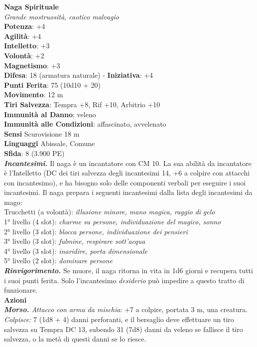 \begin{multicols}{2}
\medskip\textbf{Naga Spirituale}\\
\emph{Grande mostruosità, caotico malvagio}\\
\textbf{Potenza}: +4\\
\textbf{Agilità}: +4\\
\textbf{Intelletto}: +3\\
\textbf{Volontà}: +2\\
\textbf{Magnetismo}: +3\\
\textbf{Difesa}: 18 (armatura naturale) - \textbf{Iniziativa}: +4\\
\textbf{Punti Ferita}: 75 (10d10 + 20)\\
\textbf{Movimento}: 12 m\\
\textbf{Tiri Salvezza}: Tempra +8, Rif +10, Arbitrio +10\\
\textbf{Immunità al Danno}: veleno\\
\textbf{Immunità alle Condizioni}: affascinato, avvelenato\\
\textbf{Sensi} Scurovisione 18 m\\
\textbf{Linguaggi} Abissale, Comune\\
\textbf{Sfida}: 8 (3.900 PE)\smallskip\\
\emph{\textbf{Incantesimi.}} Il naga è un incantatore con CM 10. La sua abilità da incantatore è l'Intelletto (DC dei tiri salvezza degli incantesimi 14, +6 a colpire con attacchi con incantesimo), e ha bisogno solo delle componenti verbali per eseguire i suoi incantesimi. Il naga prepara i seguenti incantesimi dalla lista degli incantesimi da mago: \\
Trucchetti (a volontà): \emph{illusione minore, mano magica, raggio di} \emph{gelo}\\
1° livello (4 slot): \emph{charme su persone, individuazione del magico,} \emph{sonno}\\
2° livello (3 slot): \emph{blocca persone, individuazione dei pensieri}\\
3° livello (3 slot): \emph{fulmine, respirare sott'acqua}\\
4° livello (3 slot): \emph{inaridire, porta dimensionale}\\
5° livello (2 slot): \emph{dominare persone}\\
\emph{\textbf{Rinvigorimento.}} Se muore, il naga ritorna in vita in 1d6 giorni e recupera tutti i suoi punti ferita. Solo l'incantesimo \emph{desiderio} può impedire a questo tratto di funzionare.\\
\smallskip\textbf{Azioni}\\
\emph{\textbf{Morso.} Attacco con arma da mischia}: +7 a colpire, portata 3 m, una creatura.\\
\emph{Colpisce:} 7 (1d8 + 4) danni perforanti, e il bersaglio deve effettuare un tiro salvezza su Tempra DC 13, subendo 31 (7d8) danni da veleno se fallisce il tiro salvezza, o la metà di questi danni se lo riesce.\\


\end{multicols}
